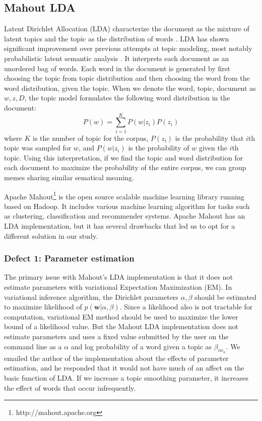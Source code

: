 \documentclass{sig-alternate}
\begin{document}
\subsection{Mahout LDA}
Latent Dirichlet Allocation (LDA)  characterize the document as the mixture of latent topics and the topic as the distribution of words \cite{Blei2003}. LDA has shown significant improvement over previous attempts at topic modeling, most notably probabilistic latent semantic analysis \cite{Hoffman1999}.  It interprets each document as an unordered bag of words. Each word in the document is generated by first choosing the topic from topic distribution and then choosing the word from the word distribution, given the topic. When we denote the word, topic, document as $w, z, D$, the topic model formulates the following word distribution in the document:
\begin{displaymath}
 P(w)=\sum_{i=1}^K P(w|z_i)P(z_i)
\end{displaymath}
where $K$ is the number of topic for the corpus, $P(z_i)$ is the probability that $i$th topic was sampled for $w$, and $P(w|z_i)$ is the probability of $w$ given the $i$th topic. Using this interpretation, if we find the topic and word distribution for each document to maximize the probability of the entire corpus, we can group memes sharing similar sematical meaning.

Apache Mahout\footnote{http://mahout.apache.org} is the open source scalable machine learning library running based on Hadoop. It includes various machine learning algorithm for tasks such as  clustering, classification and recommender systems. Apache Mahout has an LDA implementation, but it has several drawbacks that led us to opt for a different solution in our study.

\subsubsection{Defect 1: Parameter estimation}
The primary issue with Mahout's LDA implementation is that it does not estimate parameters with variational Expectation Maximization (EM). In variational inference algorithm, the Dirichlet parameters $\alpha, \beta$ should be estimated to maximize likelihood of $p(\mathbf{w}|\alpha,\beta)$. Since a likelihood also is not tractable for computation, variational EM method should be used to maximize the lower bound of a likelihood value. But the Mahout LDA implementation does not estimate parameters and uses a fixed value submitted by the user on the command line as a $\alpha$ and log probability of a word given a topic as $\beta_{iw_n}$. We emailed the author of the implementation about the effects of parameter estimation, and he responded that it would not have much of an affect on the basic function of LDA. If we increase a topic smoothing parameter, it increases the effect of words that occur infrequently.
\end{document}
